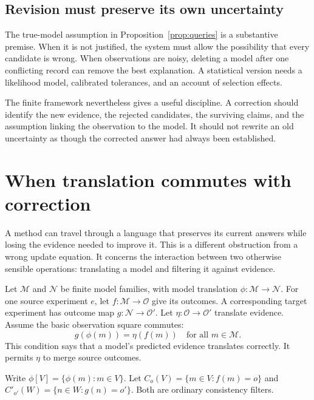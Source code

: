 \documentclass[11pt,letterpaper]{article}
\theoremstyle{plain}
\theoremstyle{definition}
\newcommand{\M}{\mathcal M}\newcommand{\E}{\mathbb E}
\begin{document}
\subsection{Revision must preserve its own uncertainty}
The true-model assumption in Proposition~\ref{prop:queries} is a substantive premise. When it is not justified, the system must allow the possibility that every candidate is wrong. When observations are noisy, deleting a model after one conflicting record can remove the best explanation. A statistical version needs a likelihood model, calibrated tolerances, and an account of selection effects.

The finite framework nevertheless gives a useful discipline. A correction should identify the new evidence, the rejected candidates, the surviving claims, and the assumption linking the observation to the model. It should not rewrite an old uncertainty as though the corrected answer had always been established.

\section{When translation commutes with correction}\label{sec:correctiontransport}
A method can travel through a language that preserves its current answers while losing the evidence needed to improve it. This is a different obstruction from a wrong update equation. It concerns the interaction between two otherwise sensible operations: translating a model and filtering it against evidence.

Let $\M$ and $\mathcal N$ be finite model families, with model translation $\phi:\M\to\mathcal N$. For one source experiment $e$, let $f:\M\to\mathcal O$ give its outcomes. A corresponding target experiment has outcome map $g:\mathcal N\to\mathcal O'$. Let $\eta:\mathcal O\to\mathcal O'$ translate evidence. Assume the basic observation square commutes:
\begin{equation}\label{eq:evidence-square}
g(\phi(m))=\eta(f(m))\quad\text{for all }m\in\M.
\end{equation}
This condition says that a model's predicted evidence translates correctly. It permits $\eta$ to merge source outcomes.

Write $\phi[V]=\{\phi(m):m\in V\}$. Let $C_o(V)=\{m\in V:f(m)=o\}$ and $C'_{o'}(W)=\{n\in W:g(n)=o'\}$. Both are ordinary consistency filters.
\end{document}
